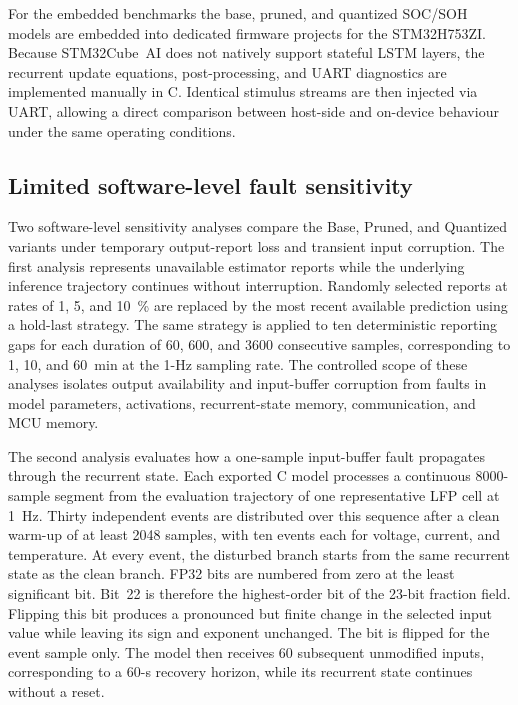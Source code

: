 \documentclass[review]{elsarticle}
\begin{document}
For the embedded benchmarks the base, pruned, and quantized SOC/SOH models are embedded into dedicated firmware projects for the STM32H753ZI. Because STM32Cube~AI does not natively support stateful LSTM layers, the recurrent update equations, post-processing, and UART diagnostics are implemented manually in C. Identical stimulus streams are then injected via UART, allowing a direct comparison between host-side and on-device behaviour under the same operating conditions.

\subsection{Limited software-level fault sensitivity}
Two software-level sensitivity analyses compare the Base, Pruned, and Quantized variants under temporary output-report loss and transient input corruption. The first analysis represents unavailable estimator reports while the underlying inference trajectory continues without interruption. Randomly selected reports at rates of 1, 5, and 10~\% are replaced by the most recent available prediction using a hold-last strategy. The same strategy is applied to ten deterministic reporting gaps for each duration of 60, 600, and 3600 consecutive samples, corresponding to 1, 10, and 60~min at the 1-Hz sampling rate. The controlled scope of these analyses isolates output availability and input-buffer corruption from faults in model parameters, activations, recurrent-state memory, communication, and MCU memory.

The second analysis evaluates how a one-sample input-buffer fault propagates through the recurrent state. Each exported C model processes a continuous 8000-sample segment from the evaluation trajectory of one representative LFP cell at 1~Hz. Thirty independent events are distributed over this sequence after a clean warm-up of at least 2048 samples, with ten events each for voltage, current, and temperature. At every event, the disturbed branch starts from the same recurrent state as the clean branch. FP32 bits are numbered from zero at the least significant bit. Bit~22 is therefore the highest-order bit of the 23-bit fraction field. Flipping this bit produces a pronounced but finite change in the selected input value while leaving its sign and exponent unchanged. The bit is flipped for the event sample only. The model then receives 60 subsequent unmodified inputs, corresponding to a 60-s recovery horizon, while its recurrent state continues without a reset.
\end{document}
